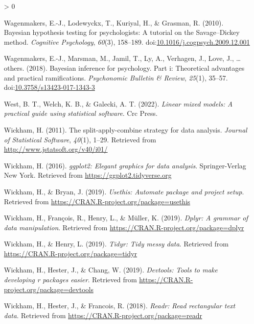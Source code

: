 \documentclass[
  english,
  doc,floatsintext]{apa6}
\newlength{\cslhangindent}
\newenvironment{CSLReferences}[2] %
 {%
  \setlength{\parindent}{0pt}
  \ifodd #1 \everypar{\setlength{\hangindent}{\cslhangindent}}\ignorespaces\fi
  \ifnum #2 > 0
  \setlength{\parskip}{#2\baselineskip}
  \fi
 }%
 {}
\begin{document}
\begin{CSLReferences}{1}{0}
\leavevmode\hypertarget{ref-wagenmakers2010bayesian}{}%
Wagenmakers, E.-J., Lodewyckx, T., Kuriyal, H., \& Grasman, R. (2010). Bayesian hypothesis testing for psychologists: A tutorial on the {Savage--Dickey} method. \emph{Cognitive Psychology}, \emph{60}(3), 158--189. doi:\href{https://doi.org/10.1016/j.cogpsych.2009.12.001}{10.1016/j.cogpsych.2009.12.001}

\leavevmode\hypertarget{ref-wagenmakers2018bayesian}{}%
Wagenmakers, E.-J., Marsman, M., Jamil, T., Ly, A., Verhagen, J., Love, J., \ldots{} others. (2018). Bayesian inference for psychology. Part i: Theoretical advantages and practical ramifications. \emph{Psychonomic Bulletin \& Review}, \emph{25}(1), 35--57. doi:\href{https://doi.org/10.3758/s13423-017-1343-3}{10.3758/s13423-017-1343-3}

\leavevmode\hypertarget{ref-west2022linear}{}%
West, B. T., Welch, K. B., \& Galecki, A. T. (2022). \emph{Linear mixed models: A practical guide using statistical software}. Crc Press.

\leavevmode\hypertarget{ref-R-plyr}{}%
Wickham, H. (2011). The split-apply-combine strategy for data analysis. \emph{Journal of Statistical Software}, \emph{40}(1), 1--29. Retrieved from \url{http://www.jstatsoft.org/v40/i01/}

\leavevmode\hypertarget{ref-R-ggplot2}{}%
Wickham, H. (2016). \emph{ggplot2: Elegant graphics for data analysis}. Springer-Verlag New York. Retrieved from \url{https://ggplot2.tidyverse.org}

\leavevmode\hypertarget{ref-R-usethis}{}%
Wickham, H., \& Bryan, J. (2019). \emph{Usethis: Automate package and project setup}. Retrieved from \url{https://CRAN.R-project.org/package=usethis}

\leavevmode\hypertarget{ref-R-dplyr}{}%
Wickham, H., François, R., Henry, L., \& Müller, K. (2019). \emph{Dplyr: A grammar of data manipulation}. Retrieved from \url{https://CRAN.R-project.org/package=dplyr}

\leavevmode\hypertarget{ref-R-tidyr}{}%
Wickham, H., \& Henry, L. (2019). \emph{Tidyr: Tidy messy data}. Retrieved from \url{https://CRAN.R-project.org/package=tidyr}

\leavevmode\hypertarget{ref-R-devtools}{}%
Wickham, H., Hester, J., \& Chang, W. (2019). \emph{Devtools: Tools to make developing r packages easier}. Retrieved from \url{https://CRAN.R-project.org/package=devtools}

\leavevmode\hypertarget{ref-R-readr}{}%
Wickham, H., Hester, J., \& Francois, R. (2018). \emph{Readr: Read rectangular text data}. Retrieved from \url{https://CRAN.R-project.org/package=readr}


\end{CSLReferences}
\end{document}
